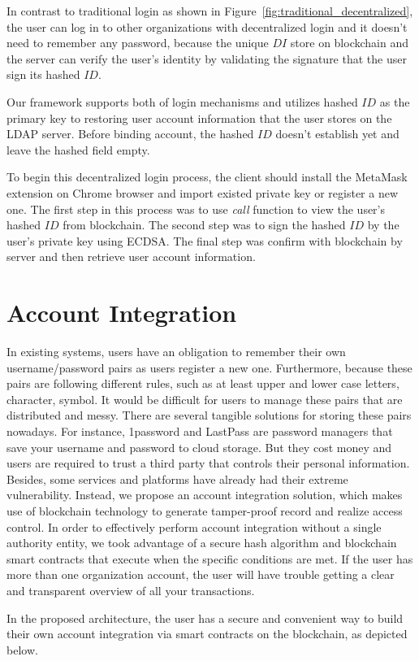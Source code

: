 In contrast to traditional login as shown in Figure~\ref{fig:traditional_decentralized}, the user can log in to other organizations with decentralized login and it doesn't need to remember any password, because the unique \(DI\) store on blockchain and the server can verify the user's identity by validating the signature that the user sign its hashed \(ID\).\par
Our framework supports both of login mechanisms and utilizes hashed \(ID\) as the primary key to restoring user account information that the user stores on the LDAP server. Before binding account, the hashed \(ID\) doesn't establish yet and leave the hashed field empty.\par 
To begin this decentralized login process, the client should install the MetaMask extension on Chrome browser and import existed private key or register a new one. The first step in this process was to use \textit{call} function to view the user's hashed \(ID\) from blockchain. The second step was to sign the hashed \(ID\) by the user's private key using ECDSA. The final step was confirm with blockchain by server and then retrieve user account information.

\section{Account Integration}
In existing systems, users have an obligation to remember their own username/password pairs as users register a new one. Furthermore, because these pairs are following different rules, such as at least upper and lower case letters, character, symbol. It would be difficult for users to manage these pairs that are distributed and messy. There are several tangible solutions for storing these pairs nowadays. For instance, 1password and LastPass are password managers that save your username and password to cloud storage. But they cost money and users are required to trust a third party that controls their personal information. Besides, some services and platforms have already had their extreme vulnerability. Instead, we propose an account integration solution, which makes use of blockchain technology to generate tamper-proof record and realize access control. In order to effectively perform account integration without a single authority entity, we took advantage of a secure hash algorithm and blockchain smart contracts that execute when the specific conditions are met. If the user has more than one organization account, the user will have trouble getting a clear and transparent overview of all your transactions.\par 
In the proposed architecture, the user has a secure and convenient way to build their own account integration via smart contracts on the blockchain, as depicted below.


